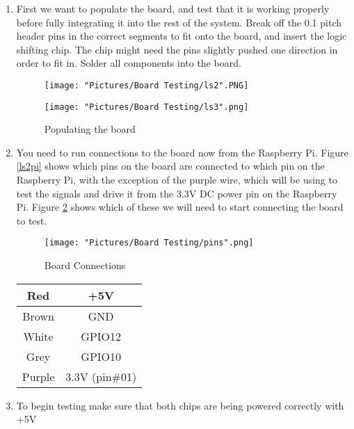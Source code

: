 \documentclass[12pt]{article}
\begin{document}
\begin{enumerate}

	\item First we want to populate the board, and test that it is working properly before fully integrating it into the rest of the system. Break off the 0.1 pitch header pins in the correct segments to fit onto the board, and insert the logic shifting chip. The chip might need the pins slightly pushed one direction in order to fit in. Solder all components into the board.

\begin{figure}[H]
 	\centering
  	\begin{minipage}[b]{0.45\textwidth}
		\texttt{[image: "Pictures/Board Testing/ls2".PNG]}
  	\end{minipage}
  	\hfill
  	\begin{minipage}[b]{0.45\textwidth}
    		\texttt{[image: "Pictures/Board Testing/ls3".png]}
  	\end{minipage}
	\caption{Populating the board}
	\label{ls2}
\end{figure}

	\item You need to run connections to the board now from the Raspberry Pi. Figure \ref{ls2pi} shows which pins on the board are connected to which pin on the Raspberry Pi, with the exception of the purple wire, which will be using to test the signals and drive it from the 3.3V DC power pin on the Raspberry Pi. Figure \ref{ls4} shows which of these we will need to start connecting the board to test.

\begin{figure}[H]
  	\centering
    	\texttt{[image: "Pictures/Board Testing/pins".png]}
 	\caption{Board Connections}
	\label{ls4}
\end{figure}

\begin{center}
\begin{tabular}[2]{| c | c |}	
	\hline
	Red & +5V \\ \hline
	Brown & GND \\ \hline
	White & GPIO12 \\ \hline
	Grey & GPIO10 \\ \hline
	Purple & 3.3V (pin\#01) \\ \hline
\end{tabular}	
\end{center}

	\item To begin testing make sure that both chips are being powered correctly with +5V
	

\end{enumerate}
\end{document}
